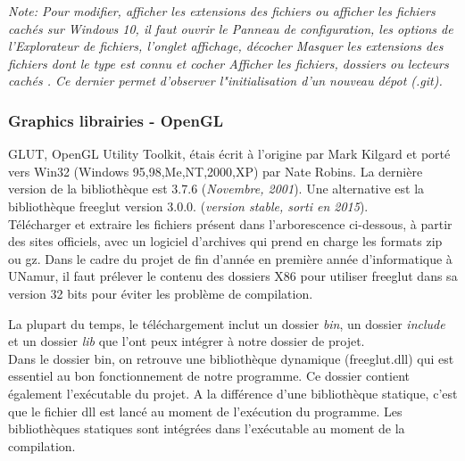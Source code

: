 \documentclass[12pt]{article}
\begin{document}
\emph{Note: Pour modifier, afficher les extensions des fichiers ou afficher les fichiers cachés sur Windows 10, il faut ouvrir le Panneau de configuration, les options de l'Explorateur de fichiers, l'onglet affichage, décocher \og Masquer les extensions des fichiers dont le type est connu \fg et cocher \og Afficher les fichiers, dossiers ou lecteurs cachés \fg. Ce dernier permet d'observer l"initialisation d'un nouveau dépot (.git).}\\

\subsubsection{Graphics librairies - OpenGL}
GLUT, OpenGL Utility Toolkit, étais écrit à l'origine par Mark Kilgard et porté vers Win32 (Windows 95,98,Me,NT,2000,XP) par Nate Robins. La dernière version de la bibliothèque est 3.7.6 (\emph{Novembre, 2001}). Une alternative est la bibliothèque freeglut version 3.0.0. (\emph{version stable, sorti en 2015}).\\

Télécharger et extraire les fichiers présent dans l'arborescence ci-dessous, à partir des sites officiels, avec un logiciel d'archives qui prend en charge les formats zip ou gz. Dans le cadre du projet de fin d'année en première année d'informatique à UNamur, il faut prélever le contenu des dossiers X86 pour utiliser freeglut dans sa version 32 bits pour éviter les problème de compilation.\cite{Champagne2}\\


La plupart du temps, le téléchargement inclut un dossier \emph{bin}, un dossier \emph{include} et un dossier \emph{lib} que l'ont peux intégrer à notre dossier de projet.\\

Dans le dossier bin, on retrouve une bibliothèque dynamique (freeglut.dll) qui est essentiel au bon fonctionnement de notre programme. Ce dossier contient également l'exécutable du projet. A la différence d'une bibliothèque statique, c'est que le fichier dll est lancé au moment de l'exécution du programme. Les bibliothèques statiques sont intégrées dans l'exécutable au moment de la compilation.\\
\end{document}
